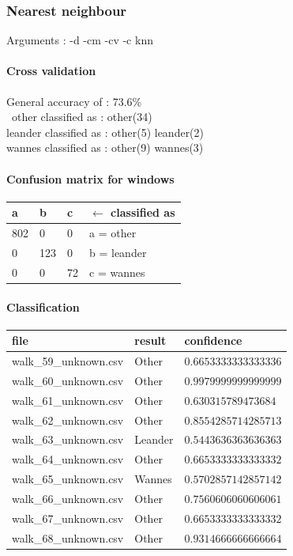 \subsubsection{Nearest neighbour}
Arguments : -d -cm -cv -c knn
\paragraph{Cross validation}
General accuracy of : 73.6\%\\\
other classified as : other(34) \\
leander classified as : other(5) leander(2) \\
wannes classified as : other(9) wannes(3)

\paragraph{Confusion matrix for windows}

\begin{tabular}{l l l | l}
    a &    b &   c & $\leftarrow$ classified as \\
    \hline
   802 & 0 & 0 &    a = other \\
    0 &  123 &  0 &    b = leander \\
    0 &   0 &  72 &    c = wannes
\end{tabular}

\paragraph{Classification}
\begin{tabular}{l | l | l}
    file & result & confidence\\ 
    \hline 
    walk\_59\_unknown.csv & Other   & $0.6653333333333336$ \\
    walk\_60\_unknown.csv & Other   & $0.9979999999999999$ \\
    walk\_61\_unknown.csv & Other   & $0.630315789473684$ \\
    walk\_62\_unknown.csv & Other   & $0.8554285714285713$ \\
    walk\_63\_unknown.csv & Leander & $0.5443636363636363$ \\
    walk\_64\_unknown.csv & Other   & $0.6653333333333332$ \\
    walk\_65\_unknown.csv & Wannes  & $0.5702857142857142$ \\
    walk\_66\_unknown.csv & Other   & $0.7560606060606061$ \\
    walk\_67\_unknown.csv & Other   & $0.6653333333333332$ \\
    walk\_68\_unknown.csv & Other   & $0.9314666666666664$
\end{tabular}

